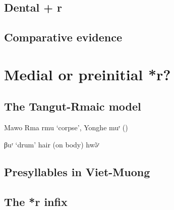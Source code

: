 \documentclass[oldfontcommands,oneside,a4paper,11pt]{article}
\newcommand{\ipa}[1]{{\phon \mbox{#1}}} %
\begin{document}
\citet[78]{baroni14invariant}

\citet{nikitina12logophoric}

\subsection{Dental + r}

%

\subsection{Comparative evidence}

\section{Medial or preinitial *r?}

\subsection{The Tangut-Rmaic model}
 
 Mawo Rma \ipa{rmu} `corpse', Yonghe \ipa{muʳ} (\citealt[41]{sims14yonghe})

\ipa{βuʳ} `drum'
hair (on body) \ipa{hwə̃ʳ}
\subsection{Presyllables in Viet-Muong}

\subsection{The *r infix}

 \citet{sagart99roc}
\end{document}
